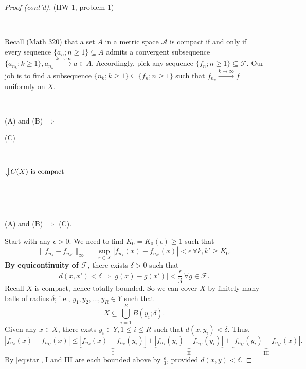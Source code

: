 \documentclass[letterpaper, reqno,11pt]{article}
\begin{document}
\begin{proof}[Proof (cont'd)]
  \noindent (HW 1, problem 1)

  ~

   Recall (Math 320) that a set $A$ in a metric space $\mathcal A$ is compact if and only if every sequence $\{ a_n ; n \geq 1 \} \subseteq A$ admits a convergent subsequence $\{ a_{n_k} ; k \geq 1\}, a_{n_k} \xrightarrow{k \to \infty} a \in A$. Accordingly, pick any sequence $\{ f_n ; n \geq 1 \} \subseteq \mathcal F$. Our job is to find a subsequence $\{ n_k ; k \geq 1 \} \subseteq \{ f_n ; n \geq 1 \}$ such that $f_{n_k} \xrightarrow{k \to \infty} f$ uniformly on $X$.

  ~

   (A) and (B) $\Rightarrow$

  {\centering (C) \par}

  \noindent{}

  ~

  {\centering $\big\Downarrow{\text{$C(X)$ is compact}}$ \par}

  ~

  \noindent{}

  ~

   (A) and (B) $\Rightarrow$ (C).

  Start with any $\epsilon > 0$. We need to find $K_0 = K_0(\epsilon) \geq 1$ such that
  $$ \lVert f_{n_k} - f_{n_{k'}} \rVert_\infty = \sup_{x \in X} |f_{n_k}(x) - f_{n_{k'}}(x)| < \epsilon ~ \forall k, k' \geq K_0. $$
  {\bf By equicontinuity of $\mathcal F$}, there exists $\delta > 0$ such that
  \begin{equation} \label{eq:star} \tag{*}
    d(x, x') < \delta \Rightarrow |g(x) - g(x')| < \frac{\epsilon}{3} ~ \forall g \in \mathcal F.
  \end{equation}
  Recall $X$ is compact, hence totally bounded. So we can cover $X$ by finitely many balls of radius $\delta$; i.e., $y_1, y_2, \ldots, y_R \in Y$ such that
  $$ X \subseteq \bigcup_{i = 1}^R B(y_i ; \delta). $$
  Given any $x \in X$, there exsts $y_i \in Y, 1 \leq i \leq R$ such that $d(x, y_i) < \delta$. Thus,
  $$ |f_{n_k}(x) - f_{n_{k'}}(x)| \leq \underbrace{|f_{n_k}(x) - f_{n_k}(y_i)|}_\text{I} + \underbrace{|f_{n_k}(y_i) - f_{n_{k'}}(y_i)|}_\text{II} + \underbrace{|f_{n_{k'}}(y_i) - f_{n_{k'}}(x)|}_\text{III}. $$
  By \eqref{eq:star}, I and III are each bounded above by $\frac{\epsilon}{3}$, provided $d(x, y) < \delta$.


\end{proof}
\end{document}
